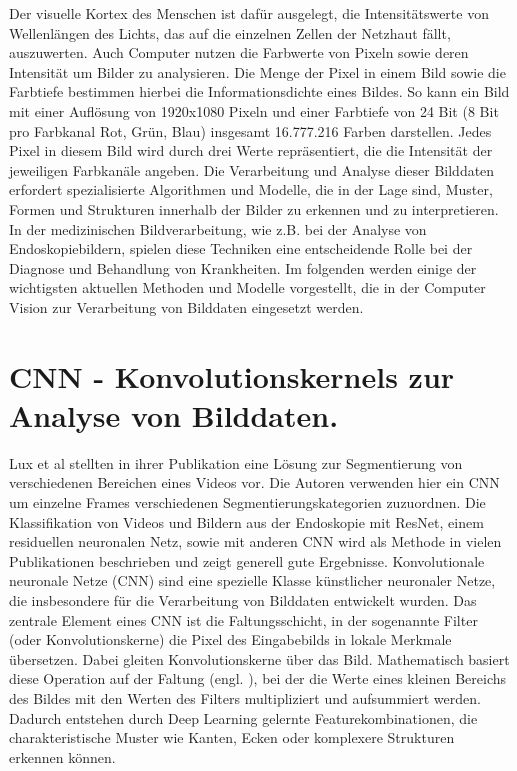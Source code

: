 Der visuelle Kortex des Menschen ist dafür ausgelegt, die Intensitätswerte von Wellenlängen des Lichts, das auf die einzelnen Zellen der Netzhaut fällt, auszuwerten. Auch Computer nutzen die Farbwerte von Pixeln sowie deren Intensität um Bilder zu analysieren. Die Menge der Pixel in einem Bild sowie die Farbtiefe bestimmen hierbei die Informationsdichte eines Bildes. So kann ein Bild mit einer Auflösung von 1920x1080 Pixeln und einer Farbtiefe von 24 Bit (8 Bit pro Farbkanal Rot, Grün, Blau) insgesamt 16.777.216 Farben darstellen. Jedes Pixel in diesem Bild wird durch drei Werte repräsentiert, die die Intensität der jeweiligen Farbkanäle angeben. Die Verarbeitung und Analyse dieser Bilddaten erfordert spezialisierte Algorithmen und Modelle, die in der Lage sind, Muster, Formen und Strukturen innerhalb der Bilder zu erkennen und zu interpretieren. In der medizinischen Bildverarbeitung, wie z.B. bei der Analyse von Endoskopiebildern, spielen diese Techniken eine entscheidende Rolle bei der Diagnose und Behandlung von Krankheiten. Im folgenden werden einige der wichtigsten aktuellen Methoden und Modelle vorgestellt, die in der Computer Vision zur Verarbeitung von Bilddaten eingesetzt werden.


\section{CNN - Konvolutionskernels zur Analyse von Bilddaten.}

Lux et al \cite{lux-2023} stellten in ihrer Publikation eine Lösung zur Segmentierung von verschiedenen Bereichen eines Videos vor. Die Autoren verwenden hier ein CNN um einzelne Frames verschiedenen Segmentierungskategorien zuzuordnen. Die Klassifikation von Videos und Bildern aus der Endoskopie mit ResNet, einem residuellen neuronalen Netz, sowie mit anderen CNN wird als Methode in vielen Publikationen beschrieben und zeigt generell gute Ergebnisse. \cite{9360830} Konvolutionale neuronale Netze (CNN) \cite{6795724} sind eine spezielle Klasse künstlicher neuronaler Netze, die insbesondere für die Verarbeitung von Bilddaten entwickelt wurden. Das zentrale Element eines CNN ist die Faltungsschicht, in der sogenannte Filter (oder Konvolutionskerne) die Pixel des Eingabebilds in lokale Merkmale übersetzen. Dabei gleiten Konvolutionskerne  über das Bild. Mathematisch basiert diese Operation auf der Faltung (engl. ), bei der die Werte eines kleinen Bereichs des Bildes mit den Werten des Filters multipliziert und aufsummiert werden. Dadurch entstehen durch Deep Learning gelernte Featurekombinationen, die charakteristische Muster wie Kanten, Ecken oder komplexere Strukturen erkennen können.


